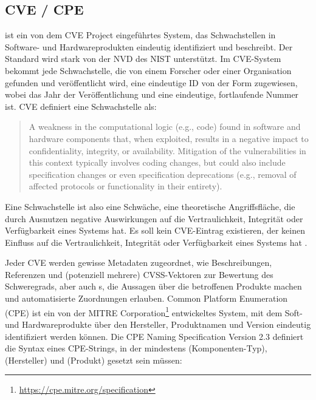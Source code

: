 \subsection{CVE / CPE} \label{subsec:projektbericht-grundlagen-cve-cpe}

 ist ein von dem CVE Project eingeführtes System, das Schwachstellen in Software- und Hardwareprodukten eindeutig identifiziert und beschreibt.
Der Standard wird stark von der NVD des NIST unterstützt.
Im CVE-System bekommt jede Schwachstelle, die von einem Forscher oder einer Organisation gefunden und veröffentlicht wird, eine eindeutige ID von der Form  zugewiesen, wobei  das Jahr der Veröffentlichung und  eine eindeutige, fortlaufende Nummer ist.
CVE definiert eine Schwachstelle als:

\begin{quote}
    A weakness in the computational logic (e.g., code) found in software and hardware components that, when exploited, results in a negative impact to confidentiality, integrity, or availability.
    Mitigation of the vulnerabilities in this context typically involves coding changes, but could also include specification changes or even specification deprecations (e.g., removal of affected protocols or functionality in their entirety).
    \cite{nvdVulnerabilityDefinition}
\end{quote}

Eine Schwachstelle ist also eine Schwäche, eine theoretische Angriffsfläche, die durch Ausnutzen negative Auswirkungen auf die Vertraulichkeit, Integrität oder Verfügbarkeit eines Systems hat.
Es soll kein CVE-Eintrag existieren, der keinen Einfluss auf die Vertraulichkeit, Integrität oder Verfügbarkeit eines Systems hat \cite{nvdVulnerabilityMetrics}.

Jeder CVE werden gewisse Metadaten zugeordnet, wie Beschreibungen, Referenzen und (potenziell mehrere) CVSS-Vektoren zur Bewertung des Schweregrads, aber auch s, die Aussagen über die betroffenen Produkte machen und automatisierte Zuordnungen erlauben.
Common Platform Enumeration (CPE) ist ein von der MITRE Corporation\footnote{\url{https://cpe.mitre.org/specification}} entwickeltes System, mit dem Soft- und Hardwareprodukte über den Hersteller, Produktnamen und Version eindeutig identifiziert werden können.
Die CPE Naming Specification Version 2.3 \cite[Seite 37, Kapitel 6.2]{NISTIR7695} definiert die Syntax eines CPE-Strings, in der mindestens  (Komponenten-Typ),  (Hersteller) und  (Produkt) gesetzt sein müssen:

